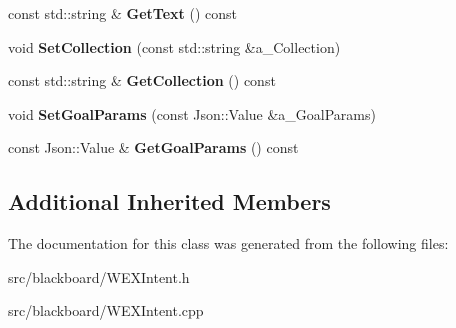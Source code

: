 \begin{DoxyCompactItemize}
const std\+::string \& {\bfseries Get\+Text} () const
\item 
\mbox{\label{class_w_e_x_intent_af6b8ad05736e7934c3cff68b0a4fa38a}} 
void {\bfseries Set\+Collection} (const std\+::string \&a\+\_\+\+Collection)
\item 
\mbox{\label{class_w_e_x_intent_a91d7528205fc915151bc450d0d46d7d2}} 
const std\+::string \& {\bfseries Get\+Collection} () const
\item 
\mbox{\label{class_w_e_x_intent_ae43fc1909b97db7c731c6150798ae00b}} 
void {\bfseries Set\+Goal\+Params} (const Json\+::\+Value \&a\+\_\+\+Goal\+Params)
\item 
\mbox{\label{class_w_e_x_intent_a71b8508cc6d67b2d64846875dedc0dcc}} 
const Json\+::\+Value \& {\bfseries Get\+Goal\+Params} () const
\end{DoxyCompactItemize}
\subsection*{Additional Inherited Members}


The documentation for this class was generated from the following files\+:\begin{DoxyCompactItemize}
\item 
src/blackboard/W\+E\+X\+Intent.\+h\item 
src/blackboard/W\+E\+X\+Intent.\+cpp\end{DoxyCompactItemize}
